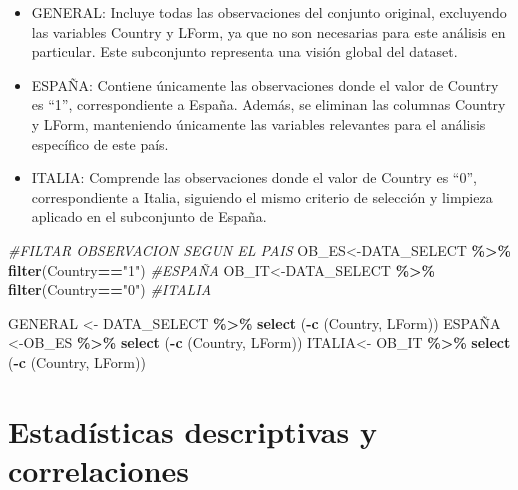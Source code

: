 \documentclass[
]{article}
\newenvironment{Shaded}{\begin{snugshade}}{\end{snugshade}}
\newcommand{\CommentTok}[1]{\textcolor[rgb]{0.56,0.35,0.01}{\textit{#1}}}
\newcommand{\FunctionTok}[1]{\textcolor[rgb]{0.13,0.29,0.53}{\textbf{#1}}}
\newcommand{\NormalTok}[1]{#1}
\newcommand{\OtherTok}[1]{\textcolor[rgb]{0.56,0.35,0.01}{#1}}
\newcommand{\SpecialCharTok}[1]{\textcolor[rgb]{0.81,0.36,0.00}{\textbf{#1}}}
\newcommand{\StringTok}[1]{\textcolor[rgb]{0.31,0.60,0.02}{#1}}
\providecommand{\tightlist}{%
  \setlength{\itemsep}{0pt}\setlength{\parskip}{0pt}}
\begin{document}
\begin{itemize}
\tightlist
\item
  GENERAL: Incluye todas las observaciones del conjunto original,
  excluyendo las variables Country y LForm, ya que no son necesarias
  para este análisis en particular. Este subconjunto representa una
  visión global del dataset.
\item
  ESPAÑA: Contiene únicamente las observaciones donde el valor de
  Country es ``1'', correspondiente a España. Además, se eliminan las
  columnas Country y LForm, manteniendo únicamente las variables
  relevantes para el análisis específico de este país.
\item
  ITALIA: Comprende las observaciones donde el valor de Country es
  ``0'', correspondiente a Italia, siguiendo el mismo criterio de
  selección y limpieza aplicado en el subconjunto de España.
\end{itemize}

\begin{Shaded}
\begin{Highlighting}[]
\CommentTok{\#FILTAR OBSERVACION SEGUN EL PAIS}
\NormalTok{OB\_ES}\OtherTok{\textless{}{-}}\NormalTok{DATA\_SELECT }\SpecialCharTok{\%\textgreater{}\%} \FunctionTok{filter}\NormalTok{(Country}\SpecialCharTok{==}\StringTok{"1"}\NormalTok{) }\CommentTok{\#ESPAÑA}
\NormalTok{OB\_IT}\OtherTok{\textless{}{-}}\NormalTok{DATA\_SELECT }\SpecialCharTok{\%\textgreater{}\%} \FunctionTok{filter}\NormalTok{(Country}\SpecialCharTok{==}\StringTok{"0"}\NormalTok{) }\CommentTok{\#ITALIA}

\NormalTok{GENERAL }\OtherTok{\textless{}{-}}\NormalTok{ DATA\_SELECT }\SpecialCharTok{\%\textgreater{}\%} \FunctionTok{select}\NormalTok{ (}\SpecialCharTok{{-}}\FunctionTok{c}\NormalTok{ (Country, LForm))}
\NormalTok{ESPAÑA }\OtherTok{\textless{}{-}}\NormalTok{OB\_ES }\SpecialCharTok{\%\textgreater{}\%} \FunctionTok{select}\NormalTok{ (}\SpecialCharTok{{-}}\FunctionTok{c}\NormalTok{ (Country, LForm)) }
\NormalTok{ITALIA}\OtherTok{\textless{}{-}}\NormalTok{ OB\_IT }\SpecialCharTok{\%\textgreater{}\%} \FunctionTok{select}\NormalTok{ (}\SpecialCharTok{{-}}\FunctionTok{c}\NormalTok{ (Country, LForm))}
\end{Highlighting}
\end{Shaded}

\section{Estadísticas descriptivas y
correlaciones}\label{estaduxedsticas-descriptivas-y-correlaciones}
\end{document}
